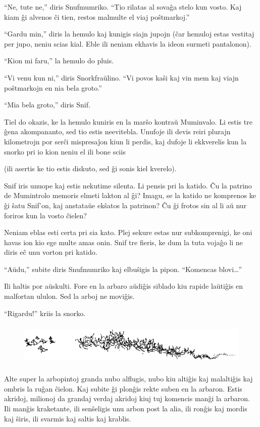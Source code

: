 ``Ne, tute ne,'' diris Snufmumriko. ``Tio rilatas al sovaĝa stelo kun vosto. Kaj kiam ĝi alvenos ĉi tien, restos malmulte el viaj poŝtmarkoj.''

``Gardu min,'' diris la hemulo kaj kunigis siajn jupojn (ĉar hemuloj estas vestitaj per jupo, neniu scias kial. Eble ili neniam ekhavis la ideon surmeti pantalonon).

``Kion mi faru,'' la hemulo do pluis.

``Vi venu kun ni,'' diris Snorkfraŭlino. ``Vi povos kaŝi kaj vin mem kaj viajn poŝtmarkojn en nia bela groto.''

``Mia bela groto,'' diris Snif.

\sectionbreak

Tiel do okazis, ke la hemulo kuniris en la marŝo kontraŭ Muminvalo. Li estis tre ĝena akompananto, sed tio estis neevitebla. Unufoje ili devis reiri plurajn kilometrojn por serĉi mispresaĵon kiun li perdis, kaj dufoje li ekkverelis kun la snorko pri io kion neniu el ili bone sciis

(ili asertis ke tio estis diskuto, sed ĝi sonis kiel kverelo).

Snif iris unuope kaj estis nekutime silenta. Li pensis pri la katido. Ĉu la patrino de Mumintrolo memoris elmeti lakton al ĝi? Imagu, se la katido ne komprenos ke ĝi ŝatu Snif'on, kaj anstataŭe ekŝatos la patrinon? Ĉu ĝi frotos sin al li aŭ nur foriros kun la vosto ĉielen?

Neniam eblas esti certa pri sia kato. Plej sekure estas nur subkomprenigi, ke oni havas ion kio ege multe amas onin. Snif tre fieris, ke dum la tuta vojaĝo li ne diris eĉ unu vorton pri katido.

``Aŭdu,'' subite diris Snufmumriko kaj elbuŝigis la pipon. ``Komencas blovi{\ldots}''

Ili haltis por aŭskulti. Fore en la arbaro aŭdiĝis siblado kiu rapide laŭtiĝis en malfortan ululon. Sed la arboj ne moviĝis.

``Rigardu!'' kriis la snorko.

\begin{figure}[htbp]
\centering
\includegraphics[width=400pt,height=58pt]{8-4.png}
\caption{}
\label{8-4}
\end{figure}

Alte super la arbopintoj granda nubo alflugis, nubo kiu altiĝis kaj malaltiĝis kaj ombris la ruĝan ĉielon. Kaj subite ĝi plonĝis rekte suben en la arbaron. Estis akridoj, milionoj da grandaj verdaj akridoj kiuj tuj komencis manĝi la arbaron. Ili manĝis kraketante, ili senŝeligis unu arbon post la alia, ili ronĝis kaj mordis kaj ŝiris, ili svarmis kaj saltis kaj krablis.

